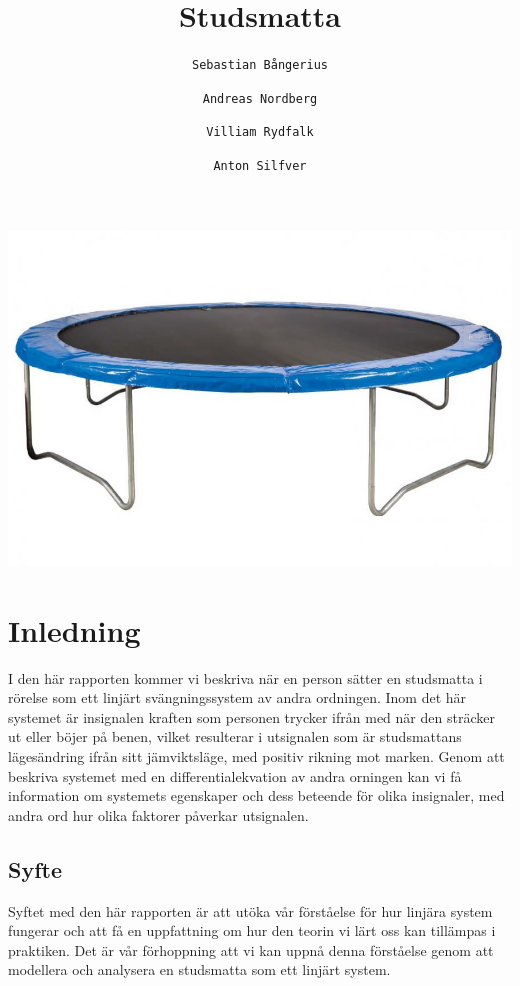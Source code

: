 \documentclass[10pt,a4paper]{article}
\author{
  \texttt{Sebastian Bångerius}
  \and
  \texttt{Andreas Nordberg}
  \and
  \texttt{Villiam Rydfalk}
  \and
  \texttt{Anton Silfver}
}
\begin{document}

\title{Studsmatta}
\maketitle
\includegraphics[scale=0.35]{Framsida}
\cleardoublepage

\tableofcontents

\clearpage

\section{Inledning}
\setcounter{page}{3}

I den här rapporten kommer vi beskriva när en person sätter en studsmatta i rörelse som ett linjärt svängningssystem av andra ordningen. Inom det här systemet är insignalen kraften som personen trycker ifrån med när den sträcker ut eller böjer på benen, vilket resulterar i utsignalen som är studsmattans lägesändring ifrån sitt jämviktsläge, med positiv rikning mot marken. Genom att beskriva systemet med en differentialekvation av andra orningen kan vi få information om systemets egenskaper och dess beteende för olika insignaler, med andra ord hur olika faktorer påverkar utsignalen\cite[s.~57]{sune2000}.

\subsection{Syfte}
Syftet med den här rapporten är att utöka vår förståelse för hur linjära system fungerar och att få en uppfattning om hur den teorin vi lärt oss kan tillämpas i praktiken. Det är vår förhoppning att vi kan uppnå denna förståelse genom att modellera och analysera en studsmatta som ett linjärt system.
\end{document}
